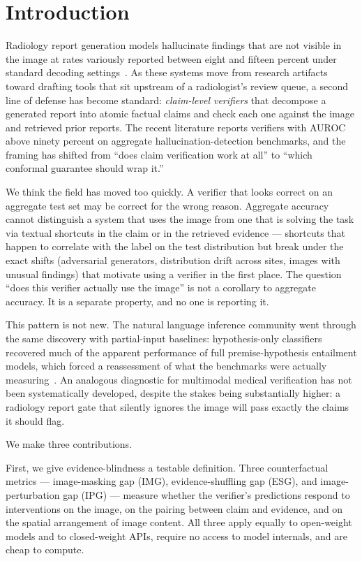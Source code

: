 \documentclass[11pt]{article}
\begin{document}
\section{Introduction}

Radiology report generation models hallucinate findings that are not visible in the image at rates variously reported between eight and fifteen percent under standard decoding settings~\cite{radflag,rextrust}. As these systems move from research artifacts toward drafting tools that sit upstream of a radiologist's review queue, a second line of defense has become standard: \emph{claim-level verifiers} that decompose a generated report into atomic factual claims and check each one against the image and retrieved prior reports. The recent literature reports verifiers with AUROC above ninety percent on aggregate hallucination-detection benchmarks, and the framing has shifted from ``does claim verification work at all'' to ``which conformal guarantee should wrap it.''

We think the field has moved too quickly. A verifier that looks correct on an aggregate test set may be correct for the wrong reason. Aggregate accuracy cannot distinguish a system that uses the image from one that is solving the task via textual shortcuts in the claim or in the retrieved evidence --- shortcuts that happen to correlate with the label on the test distribution but break under the exact shifts (adversarial generators, distribution drift across sites, images with unusual findings) that motivate using a verifier in the first place. The question ``does this verifier actually use the image'' is not a corollary to aggregate accuracy. It is a separate property, and no one is reporting it.

This pattern is not new. The natural language inference community went through the same discovery with partial-input baselines: hypothesis-only classifiers recovered much of the apparent performance of full premise-hypothesis entailment models, which forced a reassessment of what the benchmarks were actually measuring~\cite{gururangan2018annotation,poliak2018hypothesis}. An analogous diagnostic for multimodal medical verification has not been systematically developed, despite the stakes being substantially higher: a radiology report gate that silently ignores the image will pass exactly the claims it should flag.

We make three contributions.

First, we give evidence-blindness a testable definition. Three counterfactual metrics --- image-masking gap (IMG), evidence-shuffling gap (ESG), and image-perturbation gap (IPG) --- measure whether the verifier's predictions respond to interventions on the image, on the pairing between claim and evidence, and on the spatial arrangement of image content. All three apply equally to open-weight models and to closed-weight APIs, require no access to model internals, and are cheap to compute.
\end{document}
